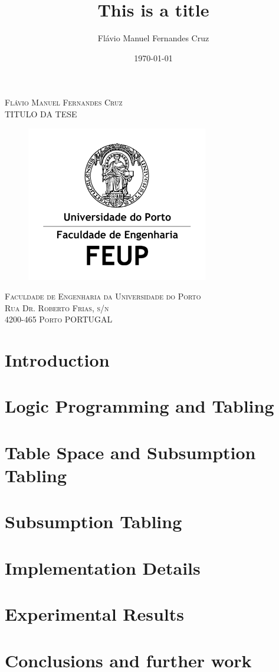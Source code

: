 \documentclass[11pt]{report}
\title{\fontsize{20}{30}\bfseries This is a title}
\author{Flávio Manuel Fernandes Cruz \\}
\date{\today}
\begin{document}
  
\begin{titlepage}

\begin{center}
  
\textsc{\large Flávio Manuel Fernandes Cruz}\\[1.5cm]

\textsc{\LARGE TITULO DA TESE}
\begin{figure}[ht]
  \centering
  \includegraphics[scale=0.7]{04.png}
\end{figure}


\textsc{\large Faculdade de Engenharia da Universidade do Porto\\ \small Rua Dr. Roberto Frias, s/n \\ 4200-465 Porto PORTUGAL}\\[1.5cm]
  
\end{center}
\end{titlepage}

\tableofcontents
\listoffigures
\listoftables
\listofalgorithms
\clearpage

\chapter{Introduction}


\chapter{Logic Programming and Tabling}


\chapter{Table Space and Subsumption Tabling}


\chapter{Subsumption Tabling}
\chapter{Implementation Details}
\chapter{Experimental Results}
\chapter{Conclusions and further work}
  
\renewcommand{\bibname}{References}

{}
\end{document}
